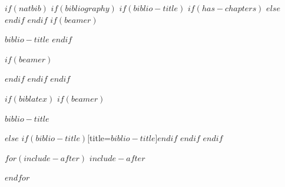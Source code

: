 \documentclass[
$if(fontsize)$
  $fontsize$,
$endif$
$if(papersize)$
  $papersize$paper,
$else$
  paper=a4,
$endif$
$if(beamer)$
  ignorenonframetext,
$if(handout)$
  handout,
$endif$
$if(aspectratio)$
  aspectratio=$aspectratio$,
$endif$
$endif$
$for(classoption)$
  $classoption$$sep$,
$endfor$
  ,captions=tableheading
]{$if(beamer)$$documentclass$$else$$if(book)$scrbook$else$scrartcl$endif$$endif$}
\newif\ifbibliography
\begin{document}
$if(natbib)$
$if(bibliography)$
$if(biblio-title)$
$if(has-chapters)$
\renewcommand\bibname{$biblio-title$}
$else$
\renewcommand\refname{$biblio-title$}
$endif$
$endif$
$if(beamer)$
\begin{frame}[allowframebreaks]{$biblio-title$}
  \bibliographytrue
$endif$
  
$if(beamer)$
\end{frame}
$endif$
$endif$
$endif$

$if(biblatex)$
$if(beamer)$
\begin{frame}[allowframebreaks]{$biblio-title$}
  \bibliographytrue
  \printbibliography[heading=none]
\end{frame}
$else$
\printbibliography$if(biblio-title)$[title=$biblio-title$]$endif$
$endif$
$endif$

$for(include-after)$
$include-after$

$endfor$
\end{document}

